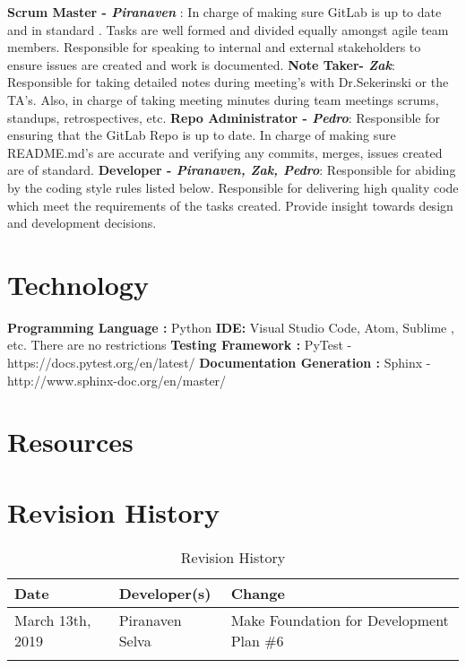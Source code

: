 \documentclass{article}
\begin{document}
\textbf{Scrum Master -\emph{ Piranaven }}: In charge of making sure GitLab is up to date and in standard . Tasks are well formed and divided equally amongst agile team members. Responsible for  speaking to internal and external stakeholders to ensure issues are created and work is documented. \newline
\textbf{Note Taker- \emph{Zak}}:  Responsible for taking detailed notes during meeting's with Dr.Sekerinski or the TA's. Also, in charge of taking meeting minutes during team meetings  scrums, standups, retrospectives, etc. \newline
\textbf{Repo Administrator - \emph{ Pedro}}:  Responsible for ensuring that the GitLab Repo is up to date. In charge of making sure README.md's are accurate and verifying any commits, merges, issues created are of standard.   \newline
\textbf{Developer - \emph{ Piranaven, Zak, Pedro}}: Responsible for abiding by the coding style rules listed below. Responsible for delivering high quality code which meet the requirements of the tasks created. Provide insight towards design and development decisions.  \newline




\section{Technology}

\textbf{Programming Language :} Python \newline
\textbf{IDE:}  Visual Studio Code, Atom, Sublime , etc. There are no restrictions\newline 
\textbf{Testing Framework :} PyTest  - https://docs.pytest.org/en/latest/ \newline
\textbf{Documentation Generation :} Sphinx - http://www.sphinx-doc.org/en/master/ \newline 



\section{Resources}

\href{https://www.python.org/dev/peps/pep-3103/}


\newpage
\section{Revision History}
\begin{table}[hp]
\caption{Revision History} \label{TblRevisionHistory}
\begin{tabularx}{\textwidth}{llX}
\toprule
\textbf{Date} & \textbf{Developer(s)} & \textbf{Change}\\
\midrule
March 13th, 2019 &Piranaven Selva & Make Foundation for Development Plan \#6 \\
\\
\bottomrule
\end{tabularx}
\end{table}
\end{document}
